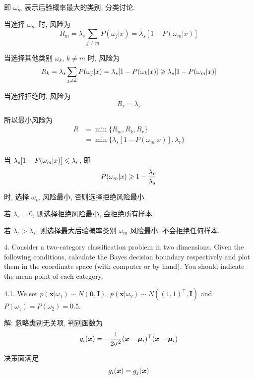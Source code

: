 \documentclass{article}
\begin{document}
即 $\omega_m$ 表示后验概率最大的类别, 分类讨论. 

当选择 $\omega_m$ 时, 风险为
\begin{equation}
  R_m=\lambda_s\sum_{j\neq m}P(\omega_j|x)=\lambda_s[1-P(\omega_m|x)]
\end{equation}

当选择其他类别 $\omega_k$, $k\neq m$ 时, 风险为
\begin{equation}
  R_k=\lambda_s\sum_{j\neq k}P(\omega_j|x)=\lambda_s[1-P(\omega_k|x)]\geqslant\lambda_s[1-P(\omega_m|x)]
\end{equation}

当选择拒绝时, 风险为
\begin{equation}
  R_r=\lambda_r
\end{equation}

所以最小风险为
\begin{equation}
  \begin{aligned}
    R
    &=\min\{R_m,R_k,R_r\}\\
    &=\min\{\lambda_s[1-P(\omega_m|x)],\lambda_r\}\\
  \end{aligned}
\end{equation}

当 $\lambda_s[1-P(\omega_m|x)]\leqslant\lambda_r$, 即
\begin{equation}
  P(\omega_m|x)\geqslant1-\frac{\lambda_r}{\lambda_s}
\end{equation}

时, 选择 $\omega_m$ 风险最小, 否则选择拒绝风险最小.

若 $\lambda_r=0$, 则选择拒绝风险最小, 会拒绝所有样本.

若 $\lambda_r>\lambda_s$, 则选择最大后验概率类别 $\omega_m$ 风险最小, 不会拒绝任何样本.

4. Consider a two-category classification problem in two dimensions. Given the following conditions, calculate the Bayes decision boundary respectively and plot them in the coordinate space (with computer or by hand). You should indicate the mean point of each category.

4.1. We set $p(\bm{x}|\omega_1)\sim N(\bm{0},\bm{I})$, $p(\bm{x}|\omega_2)\sim N\left((1,1)^{\top},\bm{I}\right)$ and $P(\omega_1)=P(\omega_2)=0.5$. 

解: 忽略类别无关项, 判别函数为
\begin{equation}
  g_i(\bm{x})=-\frac{1}{2\sigma^2}(\bm{x}-\bm{\mu}_i)^{\top}(\bm{x}-\bm{\mu}_i)
\end{equation}

决策面满足
\begin{equation}
  g_i(\bm{x})=g_j(\bm{x})
\end{equation}
\end{document}

